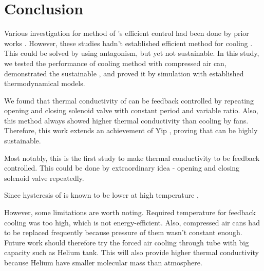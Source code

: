 \section{Conclusion}
Various investigation for method of \scp's efficient control had been done by prior works \cite{haines,mirvakili,yip}. %
However, these studies hadn't established efficient method for cooling \scp. %
This could be solved by using antagonism, but yet not sustainable.
In this study, we tested the performance of cooling method with compressed air can, demonstrated the sustainable \apcnospace, and proved it by simulation with established thermodynamical models. %

We found that thermal conductivity of \scp can be feedback controlled by repeating opening and closing solenoid valve with constant period and variable ratio. %
Also, this method always showed higher thermal conductivity than cooling by fans.
Therefore, this work extends an achievement of Yip \etal, proving that \apc can be highly sustainable.

Most notably, this is the first study to make thermal conductivity to be feedback controlled. This could be done by extraordinary idea - opening and closing solenoid valve repeatedly.

Since hysteresis of \scp is known to be lower at high temperature \cite{moretti}, 

However, some limitations are worth noting. Required temperature for feedback cooling was too high, which is not energy-efficient.
Also, compressed air cans had to be replaced frequently because pressure of them wasn't constant enough. 
Future work should therefore try the forced air cooling through tube with big capacity such as Helium tank. 
This will also provide higher thermal conductivity because Helium have smaller molecular mass than atmosphere.


